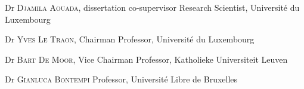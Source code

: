 \begin{titlepage}
\begin{addmargin}[-1cm]{-1cm}
\normalsize \noindent Dr \textsc{Djamila Aouada}, dissertation co-supervisor \newline
\small Research Scientist, Universit\'{e} du Luxembourg\\ \vskip-0.3cm

\normalsize \noindent Dr \textsc{Yves Le Traon}, Chairman \newline
\small Professor, Universit\'{e} du Luxembourg \\ \vskip-0.3cm

\normalsize \noindent Dr \textsc{Bart De Moor}, Vice Chairman \newline
\small Professor, Katholieke Universiteit Leuven \\ \vskip-0.3cm

\normalsize \noindent Dr \textsc{Gianluca Bontempi} \newline
\small Professor, Universit\'e Libre de Bruxelles

\end{addmargin}
\end{titlepage}
